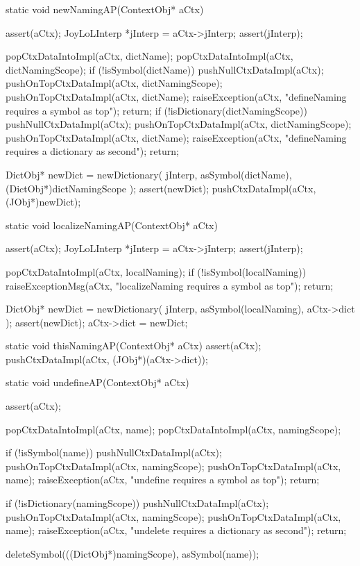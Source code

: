 \startCCode
static void newNamingAP(ContextObj* aCtx) {
  assert(aCtx);
  JoyLoLInterp *jInterp = aCtx->jInterp;
  assert(jInterp);

  popCtxDataIntoImpl(aCtx, dictName);
  popCtxDataIntoImpl(aCtx, dictNamingScope);
  if (!isSymbol(dictName)) {
    pushNullCtxDataImpl(aCtx);
    pushOnTopCtxDataImpl(aCtx, dictNamingScope);
    pushOnTopCtxDataImpl(aCtx, dictName);
    raiseException(aCtx,
      "defineNaming requires a symbol as top");
    return;
  }
  if (!isDictionary(dictNamingScope)) {
    pushNullCtxDataImpl(aCtx);
    pushOnTopCtxDataImpl(aCtx, dictNamingScope);
    pushOnTopCtxDataImpl(aCtx, dictName);
    raiseException(aCtx,
      "defineNaming requires a dictionary as second");
    return;
  }

  DictObj* newDict =
    newDictionary(
      jInterp,
      asSymbol(dictName),
      (DictObj*)dictNamingScope
    );
  assert(newDict);
  pushCtxDataImpl(aCtx, (JObj*)newDict);
}
\stopCCode

\startCCode
static void localizeNamingAP(ContextObj* aCtx) {
  assert(aCtx);
  JoyLoLInterp *jInterp = aCtx->jInterp;
  assert(jInterp);
  
  popCtxDataIntoImpl(aCtx, localNaming);
  if (!isSymbol(localNaming)){
    raiseExceptionMsg(aCtx,
      "localizeNaming requires a symbol as top");
    return;
  }
  
  DictObj* newDict = 
    newDictionary(
      jInterp,
      asSymbol(localNaming),
      aCtx->dict
    );
  assert(newDict);
  aCtx->dict = newDict;
}
\stopCCode

\startCCode
static void thisNamingAP(ContextObj* aCtx) {
  assert(aCtx);
  pushCtxDataImpl(aCtx, (JObj*)(aCtx->dict));
}
\stopCCode

\startCCode
static void undefineAP(ContextObj* aCtx) {
  assert(aCtx);
  
  popCtxDataIntoImpl(aCtx, name);
  popCtxDataIntoImpl(aCtx, namingScope);
  
  if (!isSymbol(name)) {
    pushNullCtxDataImpl(aCtx);
    pushOnTopCtxDataImpl(aCtx, namingScope);
    pushOnTopCtxDataImpl(aCtx, name);
    raiseException(aCtx,
      "undefine requires a symbol as top");
    return;
  }
  
  if (!isDictionary(namingScope)) {
    pushNullCtxDataImpl(aCtx);
    pushOnTopCtxDataImpl(aCtx, namingScope);
    pushOnTopCtxDataImpl(aCtx, name);
    raiseException(aCtx,
      "undelete requires a dictionary as second");
    return;
  }
  
  deleteSymbol(((DictObj*)namingScope), asSymbol(name));
  }
\stopCCode

